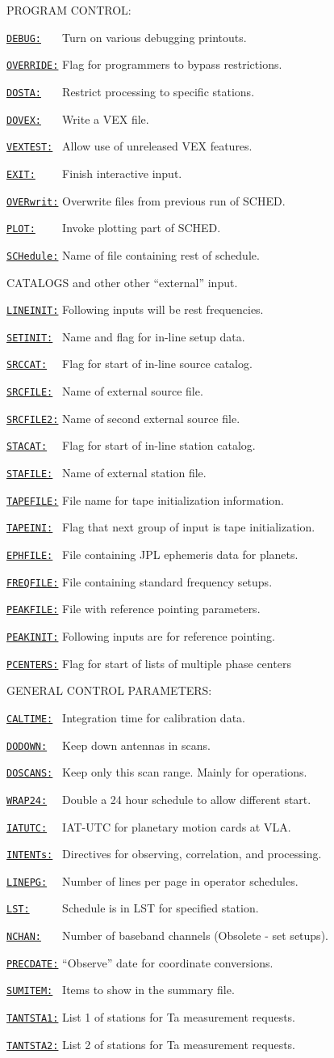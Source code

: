 \documentclass{report}
\newcommand{\sched}{{\sc SCHED}}
\newcommand{\htlm}[2]%
{\item
  \hyperref[MP:#1]{{\tt #1:}}{\tt #2}%
}
\newcommand{\htln}[3]%
{\item
  \hyperref[MP:#2]{{\tt #1:}}{\tt #3}%
}
\begin{document}
PROGRAM CONTROL:

\begin{list}{}{\parsep 0em  \itemsep 0em }
\htlm{DEBUG}{~~~} Turn on various debugging printouts.
\htlm{OVERRIDE}{} Flag for programmers to bypass restrictions.
\htlm{DOSTA}{~~~} Restrict processing to specific stations.
\htlm{DOVEX}{~~~} Write a VEX file.
\htlm{VEXTEST}{~} Allow use of unreleased VEX features.
\htlm{EXIT}{~~~~} Finish interactive input.
\htln{OVERwrit}{OVERWRIT}{} Overwrite files from previous run of
                        \sched.
\htlm{PLOT}{~~~~} Invoke plotting part of \sched.
\htln{SCHedule}{SCHEDULE}{} Name of file containing rest of schedule.
\end{list}

CATALOGS and other other ``external'' input.

\begin{list}{}{\parsep 0em  \itemsep 0em }
\htlm{LINEINIT}{} Following inputs will be rest frequencies.
\htlm{SETINIT}{~} Name and flag for in-line setup data.
\htlm{SRCCAT}{~~} Flag for start of in-line source catalog.
\htlm{SRCFILE}{~} Name of external source file.
\htlm{SRCFILE2}{} Name of second external source file.
\htlm{STACAT}{~~} Flag for start of in-line station catalog.
\htlm{STAFILE}{~} Name of external station file.
\htlm{TAPEFILE}{} File name for tape initialization information.
\htlm{TAPEINI}{~} Flag that next group of input is tape
                        initialization.
\htlm{EPHFILE}{~} File containing JPL ephemeris data for planets.
\htlm{FREQFILE}{} File containing standard frequency setups.
\htlm{PEAKFILE}{} File with reference pointing parameters.
\htlm{PEAKINIT}{} Following inputs are for reference pointing.
\htlm{PCENTERS}{} Flag for start of lists of multiple phase centers

\end{list}

GENERAL CONTROL PARAMETERS:

\begin{list}{}{\parsep 0em  \itemsep 0em }
\htlm{CALTIME}{~} Integration time for calibration data.
\htlm{DODOWN}{~~} Keep down antennas in scans.
\htlm{DOSCANS}{~} Keep only this scan range.  Mainly for operations.
\htlm{WRAP24}{~~} Double a 24 hour schedule to allow different start.
\htlm{IATUTC}{~~} IAT-UTC for planetary motion cards at VLA.
\htlm{INTENTs}{~} Directives for observing, correlation, and processing.
\htlm{LINEPG}{~~} Number of lines per page in operator schedules.
\htlm{LST}{~~~~~} Schedule is in LST for specified station.
\htlm{NCHAN}{~~~} Number of baseband channels (Obsolete - set setups).
\htlm{PRECDATE}{} ``Observe'' date for coordinate conversions.
\htlm{SUMITEM}{~} Items to show in the summary file.
\htlm{TANTSTA1}{} List 1 of stations for Ta measurement requests.
\htln{TANTSTA2}{TANTSTA1}{} List 2 of stations for Ta measurement requests.
\end{list}
\end{document}
